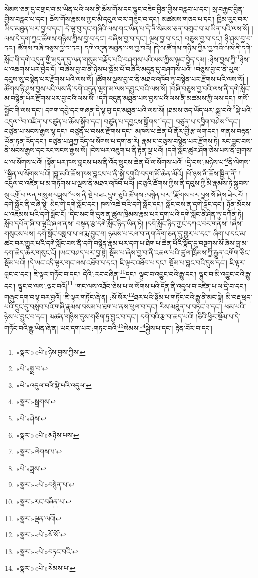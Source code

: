 སེམས་ཅན་དུ་བགྲང་བ་མ་ཡིན་པའི་ལས་ནི་ཆོས་གོས་དང་ལྷུང་བཟེད་བྱིན་གྱིས་བརླབ་པ་དང་། སྲ་བརྐྱང་བྱིན་གྱིས་བརླབ་པ་དང་། ཆོས་གོས་རྣམས་ཀྱང་མི་དབུལ་བར་གཟུང་བ་དང་། མཚམས་གཅད་པ་དང་། ཁྱིམ་རུང་བར་ཡིད་མཐུན་པར་བྱ་བ་དང་། དེ་ལྟ་བུ་དང་གཞིའི་ལས་གང་ཡིན་པ་དེ་ནི་སེམས་ཅན་བགྲང་བ་མ་ཡིན་པའི་ལས་སོ། །ལས་དེ་དག་ཀྱང་ཚོགས་གཉིས་ཀྱིས་བྱ་བ་དང་། བཞིས་བྱ་བ་དང་། ལྔས་བྱ་བ་དང་། བཅུས་བྱ་བ་དང་། ཉི་ཤུས་བྱ་བ་དང་། ཚོགས་བཞི་བཅུས་བྱ་བ་དང་། དགེ་འདུན་མཐུན་པས་བྱ་བའོ། །དེ་ལ་ཚོགས་གཉིས་ཀྱིས་བྱ་བའི་ལས་ནི་དགེ་སློང་གི་དགེ་འདུན་གྱི་མདུན་དུ་ལན་གསུམ་བརྗོད་པའི་བཤགས་པའི་ལས་ཀྱིས་ལྟུང་བྱེད་དམ། :ཉེས་བྱས་ཀྱི་\footnote{«སྣར་»«པེ་»ཉེས་བྱས་ཀྱིས་}ཉེས་པ་འཆགས་པར་བྱེད་དོ། །བཞིས་བྱ་བ་ནི་ཉེས་པ་སྦོམ་པོ་བཞིའི་མདུན་དུ་བཤགས་པའོ། །བཅུས་བྱ་བ་ནི་ཡུལ་དབུས་སུ་བསྙེན་པར་རྫོགས་པའི་ལས་སོ། །ཚོགས་ལྔས་བྱ་བ་ནི་མཐའ་འཁོབ་ཏུ་བསྙེན་པར་རྫོགས་པའི་ལས་སོ། །ཚོགས་ཉི་ཤུས་བྱས་པའི་ལས་ནི་དགེ་འདུན་ལྷག་མ་ལས་དབྱུང་བའི་ལས་སོ། །བཞི་བཅུས་བྱ་བའི་ལས་ནི་དགེ་སློང་མ་བསྙེན་པར་རྫོགས་པར་བྱ་བའི་ལས་སོ། །དགེ་འདུན་མཐུན་པས་བྱས་པའི་ལས་ནི་མཚམས་ཀྱི་ལས་དང་། གསོ་སྦྱོང་གི་ལས་དང་། དགག་དབྱེ་དང་གཞན་དེ་ལྟ་བུ་དང་མཐུན་པའི་ལས་སོ། །ཐམས་ཅད་ཡོད་པར་:སྨྲ་བའི་\footnote{«པེ་»སྨྲ་བ་}སྡེ་པའི་འདུལ་\footnote{«པེ་»འདུལ་བའི་སྡེ་པའི་འདུལ་}བ་འཛིན་པ་བཙུན་པ་ཆོས་སྐྱོབ་དང་། བཙུན་པ་དབྱངས་སྒྲོགས་\footnote{«སྣར་»སྒྲགས་}དང་། བཙུན་པ་དབྱིག་བཤེས་\footnote{«པེ་»ཤེས་}དང་། བཙུན་པ་སངས་རྒྱས་ལྷ་དང་། བཙུན་པ་བསམ་རྫོགས་དང་། མཁས་པ་ཆེན་པོ་ནོར་གྱི་རྩ་ལག་དང་། གནས་བརྟན་ཡོན་ཏན་འོད་དང་། བཙུན་པ་ཤཱཀྱ་འོད་ལ་སོགས་པ་དག་ན་རེ། རྣམ་པ་བཅུས་བསྙེན་པར་རྫོགས་ཏེ། རང་བྱུང་བས་ནི་སངས་རྒྱས་དང་རང་སངས་རྒྱས་སོ། །ངེས་པར་འཇུག་པ་ནི་རྟེན་ལྔ་པའོ། །དགེ་སློང་ཚུར་ཤོག་ཅེས་པས་ནི་གྲགས་པ་ལ་སོགས་པའོ། །སྟོན་པར་ཁས་བླངས་པས་ནི་འོད་སྲུངས་ཆེན་པོ་ལ་སོགས་པའོ། །དྲི་བས་:མཉེས་པ་\footnote{«སྣར་»«པེ་»མཉེས་པས་}ནི་ལེགས་\footnote{«སྣར་»ལེགས་པ་}སྦྱིན་ལ་སོགས་པའོ། །བླ་མའི་ཆོས་ཁས་བླངས་པ་ནི་སྐྱེ་དགུའི་བདག་མོ་ཆེན་མོའོ། །ཕོ་ཉས་ནི་ཆོས་སྦྱིན་ནོ། །འདུལ་བ་འཛིན་པ་མ་གཏོགས་པ་ལྔས་ནི་མཐའ་འཁོབ་པའོ། །བཅུའི་ཚོགས་ཀྱིས་ནི་དབུས་ཀྱི་མི་རྣམས་ཏེ་སྐྱབས་སུ་འགྲོ་བ་ལན་གསུམ་བཟླས་\footnote{«པེ་»ཟླས་}པས་ནི་སྡེ་བཟང་དྲུག་ཅུའི་ཚོགས་:བསྙེན་པར་\footnote{«སྣར་»«པེ་»བསྙེན་པ་}རྫོགས་པར་བྱས་སོ་ཞེས་ཟེར་རོ། །དགེ་སློང་ནི་བཞི་སྟེ། མིང་གི་དགེ་སློང་དང་། ཁས་འཆེ་བའི་དགེ་སློང་དང་། སློང་བས་ན་དགེ་སློང་དང་། ཉོན་མོངས་པ་འཇོམས་པའི་དགེ་སློང་ངོ། །དིང་སང་གི་དུས་ན་ཚུལ་ཁྲིམས་རྣམ་པར་དག་པའི་དགེ་སློང་ནི་ཤིན་ཏུ་དཀོན་ཏེ། སློབ་དཔོན་ཞི་བ་ལྷའི་ཞལ་ནས། བསྟན་རྩ་དགེ་སློང་ཉིད་ཡིན་ཏེ། །དགེ་སློང་ཉིད་ཀྱང་དཀའ་བར་གནས། །ཞེས་གསུངས་པས། དགེ་སློང་བསླབ་པ་ལ་རྨ་བྱུང་བ། ཉམས་པ་རལ་བ་ནག་ནོག་ཅན་དུ་གྱུར་པ་དང་། ཞིག་པ་དང་མ་ཚང་བར་གྱུར་པའི་དགེ་སློང་བས་ནི་དགེ་བསྙེན་རྣམ་པར་དག་པ་ཐེག་པ་ཆེན་པོའི་སྣོད་དུ་བསྔགས་སོ་ཞེས་བླ་མ་དག་ཆེད་ཆེར་གསུང་ངོ། །ཡང་བཤད་པར་བྱ་སྟེ། སྡོམ་པ་ཞེས་བྱ་བ་ནི་འཆལ་པའི་ཚུལ་ཁྲིམས་ཀྱི་རྒྱུན་འགོག་ཅིང་སྡོམ་པའོ། །དེ་ཡང་འདི་ལྟར་གང་ལས་འཐོབ་པ་དང་། ཇི་ལྟར་འཐོབ་པ་དང་། སྡོམ་པ་བླང་བའི་དུས་དང་། ཇི་ལྟར་བླང་བ་དང་། ཇི་ལྟར་གཏོང་བ་དང་། དེའི་:རང་བཞིན་\footnote{«སྣར་»རང་བཞིན་པ་}དང་། ལྟུང་བ་འབྱུང་བའི་རྒྱུ་དང་། ལྟུང་བ་མི་འབྱུང་བའི་རྒྱུ་དང་། ལྟུང་བ་ལས་:ལྡང་བའོ།\footnote{«སྣར་»ལྡན་ལའོ།} །གང་ལས་འཐོབ་ཅེས་པ་ལ་སོགས་པའི་དོན་ནི་འདུལ་བ་འཛིན་པ་ལ་དྲི་བ་དང་། གཞུང་དག་བལྟ་བར་བྱའོ། །ཇི་ལྟར་གཏོང་ཞེ་ན། :སོ་སོར་\footnote{«སྣར་»«པེ་»སོ་སོ་}ཐར་པའི་སྡོམ་པ་གཏོང་བའི་རྒྱུ་ནི་མང་སྟེ། མི་བརྡ་ཕྲད་པའི་དྲུང་དུ་བསླབ་པའི་གཞི་རྣམས་བསམ་པ་ཐག་པ་ནས་ཕུལ་བ་དང་། རིས་མཐུན་པ་བཏང་བ་དང་། ཕམ་པའི་ཉེས་པ་བྱུང་བ་དང་། མཚན་གཉིས་དུས་གཅིག་ཏུ་བྱུང་བ་དང་། དགེ་བའི་རྩ་བ་ཆད་པའོ། །ཅིའི་ཕྱིར་སྡོམ་པ་དེ་གཏོང་བའི་རྒྱུ་ཡིན་ཞེ་ན། ཡང་དག་པར་:གཏང་བའི་\footnote{«སྣར་»«པེ་»བཏང་བའི་}སེམས་\footnote{«སྣར་»«པེ་»སེམས་པ་}སྐྱེས་པ་དང་། རྟེན་བོར་བ་དང་། 